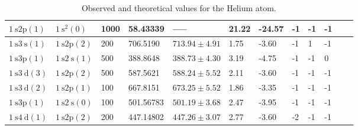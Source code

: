 \begin{table}
\begin{adjustwidth}{-1cm}{-1cm}
\begin{adjustbox}{width=1.75\textwidth, center}
\begin{tabular}{|l|l|l|l|l|l|l|l|l|l|l|l|}
                \hline $1 \mathrm{~s} 2 \mathrm{p}(1)$                      & $1 \mathrm{~s}^2(0)$             & 1000               & 58.43339                                  & -----                            & 21.22                         & -24.57                        & -1                 & -1                 & -1 \\
                \hline \cellcolor{blue!25} $1 \mathrm{~s} 3 \mathrm{~s}(1)$ & $1 \mathrm{~s} 2 \mathrm{p}(2)$  & 200                & 706.5190                                  & $713.94 \pm 4.91$                & 1.75                          & -3.60                         & -1                 & 1                  & -1 \\
                \hline \cellcolor{blue!25}  $1 \mathrm{~s} 3 \mathrm{p}(1)$ & $1 \mathrm{~s} 2 \mathrm{~s}(1)$ & 500                & 388.8648                                  & $388.73 \pm 4.30$                & 3.19                          & -4.75                         & -1                 & -1                 & 0  \\
                \hline \cellcolor{blue!25} $1 \mathrm{~s} 3 \mathrm{~d}(3)$ & $1 \mathrm{~s} 2 \mathrm{p}(2)$  & 500                & 587.5621                                  & $588.24 \pm 5.52$                & 2.11                          & -3.60                         & -1                 & -1                 & -1 \\
                \hline \cellcolor{blue!25} $1 \mathrm{~s} 3 \mathrm{~d}(2)$ & $1 \mathrm{~s} 2 \mathrm{p}(1)$  & 100                & 667.8151                                  & $673.25 \pm 5.52$                & 1.86                          & -3.35                         & -1                 & -1                 & -1 \\
                \hline \cellcolor{blue!25} $1 \mathrm{~s} 3 \mathrm{p}(1)$  & $1 \mathrm{~s} 2 \mathrm{~s}(0)$ & 100                & 501.56783                                 & $501.19 \pm 3.68$                & 2.47                          & -3.95                         & -1                 & -1                 & -1 \\
                \hline $1 \mathrm{~s} 4 \mathrm{~d}(1)$                     & $1 \mathrm{~s} 2 \mathrm{p}(2)$  & 200                & 447.14802                                 & $447.26 \pm 3.07$                & 2.77                          & -3.60                         & -2                 & -1                 & -1 \\
                \hline
            \end{tabular}

        \end{adjustbox}

    \end{adjustwidth}
    \caption{Observed and theoretical values for the Helium atom.}
    \label{tab:heliumSpectra}
\end{table}

